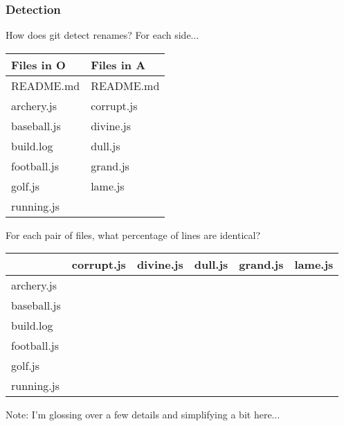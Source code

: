 \documentclass[compress,t]{beamer}
\begin{document}
\begin{frame}
  \frametitle{Detection}

  How does git detect renames?  For each side...\\[0.25em]
  \pause
  \vspace*{-1.0\baselineskip}
  \begin{center}
    {\footnotesize
    \begin{tabular}{l|l}
      Files in O   &  Files in A  \\
      \hline
      README.md    &  README.md   \\
      archery.js   &  corrupt.js  \\
      baseball.js  &  divine.js   \\
      build.log    &  dull.js     \\
      football.js  &  grand.js    \\
      golf.js      &  lame.js     \\
      running.js   &
    \end{tabular}
    }
  \end{center}
  \vspace*{-1.5\baselineskip}

  \pause
  \vspace*{\baselineskip}
  For each pair of files, what percentage of lines are identical?
  \pause
  \vspace*{-0.5\baselineskip}
  \begin{center}
    {\footnotesize
    \begin{tabular}{l|l|l|l|l|l}
                   & corrupt.js & divine.js & dull.js & grand.js & lame.js \\
      \hline
      archery.js   &&&&& \\
      baseball.js  &&&&& \\
      build.log    &&&&& \\
      football.js  &&&&& \\
      golf.js      &&&&& \\
      running.js   &&&&&
    \end{tabular}
    }
  \end{center}

  \pause
  {\small Note: I'm glossing over a few details and simplifying a bit here...}

\end{frame}

\begin{comment}
  blind
  boring
  lame
  rewarding
  corrupt

  archery
  baseball
  football
  golf
  running
\end{comment}
\end{document}
